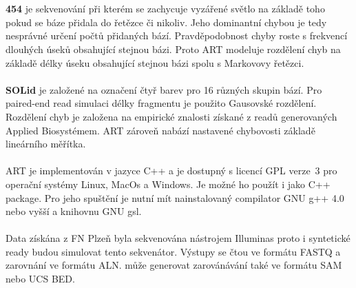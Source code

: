 \documentclass[czech,DP]{thesiskiv}
\numberwithin{equation}{section}
\begin{document}
\\
\\
\textbf{454} je sekvenování při kterém se zachycuje vyzářené světlo na základě toho pokud se báze přidala do řetězce či nikoliv. Jeho dominantní chybou je tedy nesprávné určení počtů přidaných bází. Pravděpodobnost chyby roste s frekvencí dlouhých úseků obsahující stejnou bázi. Proto ART modeluje rozdělení chyb na základě délky úseku obsahující stejnou bázi spolu s Markovovy řetězci.
\\
\\
\textbf{SOLid} je založené na označení čtyř barev pro 16 různých skupin bází. Pro paired-end read simulaci délky fragmentu je použito Gausovské rozdělení. Rozdělení chyb je založena na empirické znalosti získané z readů generovaných Applied Biosystémem. ART zároveň nabází nastavené chybovosti základě lineárního měřítka. 
\\
\\
ART je implementován v jazyce C++ a je dostupný s licencí GPL verze~3 pro operační systémy Linux, MacOs a Windows. Je možné ho použít i jako C++ package. Pro jeho spuštění je nutní mít nainstalovaný compilator GNU g++ 4.0 nebo vyšší a knihovnu GNU gsl. 
\\
\\
Data získána z FN Plzeň byla sekvenována nástrojem Illuminas proto i syntetické ready budou simulovat tento sekvenátor.   Výstupy se čtou ve formátu FASTQ a zarovnání ve formátu ALN. může generovat zarovánávání také ve formátu SAM nebo UCS BED. 
\end{document}
